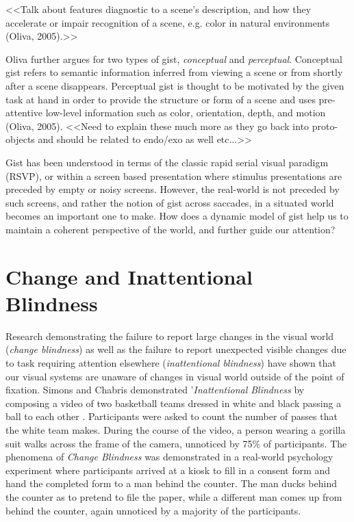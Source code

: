 \documentclass[a4paper,10pt,final]{ThesisStyle}
\begin{document}
<<Talk about features diagnostic to a scene's description, and how they accelerate or impair recognition of a scene, e.g. color in natural environments (Oliva, 2005).>>

Oliva further argues for two types of gist, \textit{conceptual} and \textit{perceptual}.  Conceptual gist refers to semantic information inferred from viewing a scene or from shortly after a scene disappears. Perceptual gist is thought to be motivated by the given task at hand in order to provide the structure or form of a scene and uses pre-attentive low-level information such as color, orientation, depth, and motion (Oliva, 2005).  <<Need to explain these much more as they go back into proto-objects and should be related to endo/exo as well etc...>>
	
Gist has been understood in terms of the classic rapid serial visual paradigm (RSVP), or within a screen based presentation where stimulus presentations are preceded by empty or noisy screens.  However, the real-world is not preceded by such screens, and rather the notion of gist across saccades, in a situated world becomes an important one to make.  How does a dynamic model of gist help us to maintain a coherent perspective of the world, and further guide our attention?  

\section{Change and Inattentional Blindness}

Research demonstrating the failure to report large changes in the visual world (\textit{change blindness}) as well as the failure to report unexpected visible changes due to task requiring attention elsewhere (\textit{inattentional blindness}) \cite{Simons1999,Rensink2000,Rensink2001,Hollingworth2001a} have shown that our visual systems are unaware of changes in visual world outside of the point of fixation.  Simons and Chabris demonstrated '\textit{Inattentional Blindness} by composing a video of two basketball teams dressed in white and black passing a ball to each other \cite{Simons1999}.  Participants were asked to count the number of passes that the white team makes.  During the course of the video, a person wearing a gorilla suit walks across the frame of the camera, unnoticed by 75\% of participants.  The phenomena of \textit{Change Blindness} was demonstrated in a real-world psychology experiment \cite{Simons1998} where participants arrived at a kiosk to fill in a consent form and hand the completed form to a man behind the counter.  The man ducks behind the counter as to pretend to file the paper, while a different man comes up from behind the counter, again unnoticed by a majority of the participants.  
\end{document}
